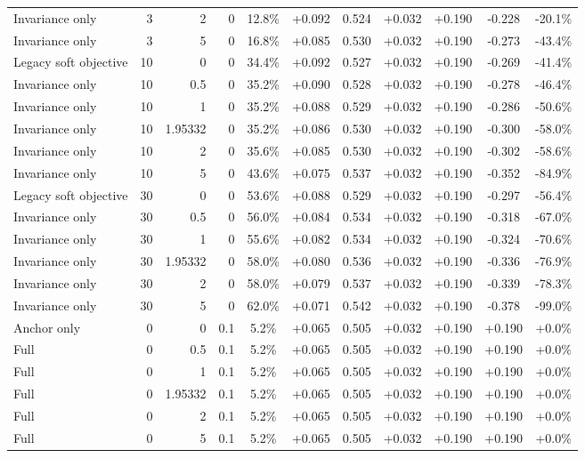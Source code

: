 \begin{table}[htbp]
\begin{tabular}{lrrrccccccc}
Invariance only & 3 & 2 & 0 & 12.8\% & +0.092 & 0.524 & +0.032 & +0.190 & -0.228 & -20.1\% \\
Invariance only & 3 & 5 & 0 & 16.8\% & +0.085 & 0.530 & +0.032 & +0.190 & -0.273 & -43.4\% \\
Legacy soft objective & 10 & 0 & 0 & 34.4\% & +0.092 & 0.527 & +0.032 & +0.190 & -0.269 & -41.4\% \\
Invariance only & 10 & 0.5 & 0 & 35.2\% & +0.090 & 0.528 & +0.032 & +0.190 & -0.278 & -46.4\% \\
Invariance only & 10 & 1 & 0 & 35.2\% & +0.088 & 0.529 & +0.032 & +0.190 & -0.286 & -50.6\% \\
Invariance only & 10 & 1.95332 & 0 & 35.2\% & +0.086 & 0.530 & +0.032 & +0.190 & -0.300 & -58.0\% \\
Invariance only & 10 & 2 & 0 & 35.6\% & +0.085 & 0.530 & +0.032 & +0.190 & -0.302 & -58.6\% \\
Invariance only & 10 & 5 & 0 & 43.6\% & +0.075 & 0.537 & +0.032 & +0.190 & -0.352 & -84.9\% \\
Legacy soft objective & 30 & 0 & 0 & 53.6\% & +0.088 & 0.529 & +0.032 & +0.190 & -0.297 & -56.4\% \\
Invariance only & 30 & 0.5 & 0 & 56.0\% & +0.084 & 0.534 & +0.032 & +0.190 & -0.318 & -67.0\% \\
Invariance only & 30 & 1 & 0 & 55.6\% & +0.082 & 0.534 & +0.032 & +0.190 & -0.324 & -70.6\% \\
Invariance only & 30 & 1.95332 & 0 & 58.0\% & +0.080 & 0.536 & +0.032 & +0.190 & -0.336 & -76.9\% \\
Invariance only & 30 & 2 & 0 & 58.0\% & +0.079 & 0.537 & +0.032 & +0.190 & -0.339 & -78.3\% \\
Invariance only & 30 & 5 & 0 & 62.0\% & +0.071 & 0.542 & +0.032 & +0.190 & -0.378 & -99.0\% \\
Anchor only & 0 & 0 & 0.1 & 5.2\% & +0.065 & 0.505 & +0.032 & +0.190 & +0.190 & +0.0\% \\
Full & 0 & 0.5 & 0.1 & 5.2\% & +0.065 & 0.505 & +0.032 & +0.190 & +0.190 & +0.0\% \\
Full & 0 & 1 & 0.1 & 5.2\% & +0.065 & 0.505 & +0.032 & +0.190 & +0.190 & +0.0\% \\
Full & 0 & 1.95332 & 0.1 & 5.2\% & +0.065 & 0.505 & +0.032 & +0.190 & +0.190 & +0.0\% \\
Full & 0 & 2 & 0.1 & 5.2\% & +0.065 & 0.505 & +0.032 & +0.190 & +0.190 & +0.0\% \\
Full & 0 & 5 & 0.1 & 5.2\% & +0.065 & 0.505 & +0.032 & +0.190 & +0.190 & +0.0\% \\

\end{tabular}
\end{table}
